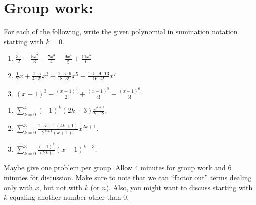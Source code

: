 \documentclass[handout]{ximera}
\begin{document}
\section{Group work:}
\begin{problem}
For each of the following, write the given polynomial in summation notation starting with $k=0$.
	\begin{enumerate}
	
	\item  $\frac{3x}{2} - \frac{5x^2}{3} + \frac{7x^3}{4} - \frac{9x^4}{5} + \frac{11x^5}{6}$
	
	\item  $\frac{1}{2}x + \frac{1 \cdot 5}{4 \cdot 2!}x^3 + \frac{1 \cdot 5 \cdot 9}{8 \cdot 3!}x^5 - \frac{1 \cdot 5 \cdot 9 \cdot 13}{16 \cdot 4!}x^7$
	
	\item  $(x-1)^3 - \frac{(x-1)^4}{2!} + \frac{(x-1)^5}{4!} - \frac{(x-1)^6}{6!} $
	
	\end{enumerate}
	
	\begin{freeResponse}
	\begin{enumerate}
	
	\item  $\sum_{k=0}^4 (-1)^k (2k+3) \frac{x^{k+1}}{k+2}$.  
	
	\item  $\sum_{k=0}^3 \frac{1 \cdot 5 \cdot \hdots \cdot (4k+1)}{2^{k+1} (k+1)!} x^{2k+1}.$
	
	\item  $\sum_{k=0}^3 \frac{(-1)^k}{(2k)!} (x-1)^{k+3}$.  
	
	\end{enumerate}
	\end{freeResponse}
	
\begin{instructorNotes}
Maybe give one problem per group.  
Allow $4$ minutes for group work and $6$ minutes for discussion.  
Make sure to note that we can ``factor out'' terms dealing only with $x$, but not with $k$ (or $n$).  
Also, you might want to discuss starting with $k$ equaling another number other than $0$.
\end{instructorNotes}

\end{problem}
\end{document}
